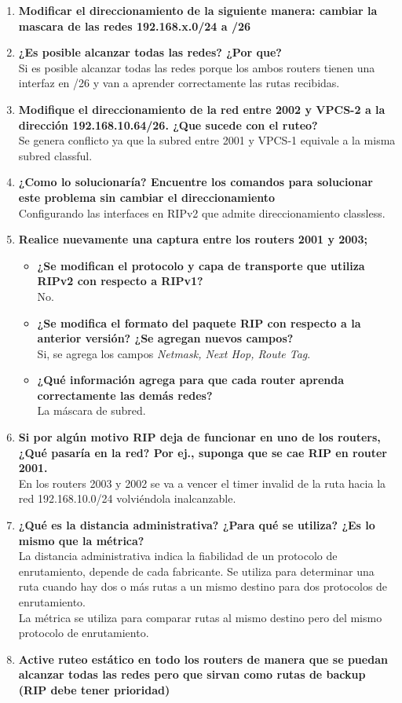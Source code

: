 \documentclass[letterpaper,12pt]{article}
\begin{document}
\begin{enumerate}
		\item \textbf{Modificar el direccionamiento de la siguiente manera: cambiar la mascara de las redes 192.168.x.0/24 a /26}
		\item \textbf{¿Es posible alcanzar todas las redes? ¿Por que?} \\
		Si es posible alcanzar todas las redes porque los ambos routers tienen una interfaz en /26 y van a aprender correctamente las rutas recibidas.
		\item \textbf{Modifique  el  direccionamiento  de  la  red  entre  2002  y  VPCS-2  a  la dirección 192.168.10.64/26. ¿Que sucede con el ruteo?} \\
		Se genera conflicto ya que la subred entre 2001 y VPCS-1 equivale a la misma subred classful.
		\item \textbf{¿Como lo solucionaría? Encuentre los comandos para solucionar este problema sin cambiar el direccionamiento} \\
		Configurando las interfaces en RIPv2 que admite direccionamiento classless.
		\item \textbf{Realice nuevamente una captura entre los routers 2001 y 2003;}
		\begin{itemize}
			\item \textbf{¿Se modifican el protocolo y capa de transporte que utiliza RIPv2 con respecto a RIPv1?} \\
			No.
			\item \textbf{¿Se modifica el formato del paquete RIP con respecto a la anterior versión? ¿Se agregan nuevos campos?} \\
			Si, se agrega los campos \textit{Netmask, Next Hop, Route Tag}.
			\item \textbf{¿Qué información agrega para que cada router aprenda correctamente las demás redes?} \\
			La máscara de subred.
		\end{itemize}
		\item \textbf{Si por algún motivo RIP deja de funcionar en uno de los routers, ¿Qué pasaría en la red? Por ej., suponga que se cae RIP en router 2001.} \\
		En los routers 2003 y 2002 se va a vencer el timer invalid de la ruta hacia la red 192.168.10.0/24 volviéndola inalcanzable. 
		\item \textbf{¿Qué es la distancia administrativa? ¿Para qué se utiliza? ¿Es lo mismo que la métrica?} \\
		La distancia administrativa indica la fiabilidad de un protocolo de enrutamiento, depende de cada fabricante. Se utiliza para determinar una ruta cuando hay dos o más rutas a un mismo destino para dos protocolos de enrutamiento. \\
		La métrica se utiliza para comparar rutas al mismo destino pero del mismo protocolo de enrutamiento.
		\item \textbf{Active ruteo estático en todo los routers de manera que  se puedan alcanzar todas las redes pero que sirvan como rutas de backup (RIP debe tener prioridad)}
		\begin{figure}[ht] 
        

\end{figure}
\end{enumerate}
\end{document}
